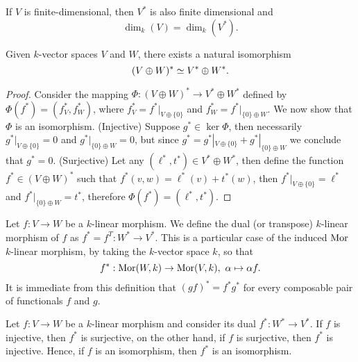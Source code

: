 \begin{proposition}
If \(V\) is finite-dimensional, then \(V^\ast\) is also finite dimensional and
\[
  \dim_k(V) = \dim_k (V^\ast).
\]
\end{proposition}

\begin{proposition}
Given \(k\)-vector spaces \(V\) and \(W\), there exists a natural isomorphism
\[
  (V \oplus W)^\ast \simeq V^\ast \oplus W^\ast.
\]
\end{proposition}

\begin{proof}
Consider the mapping \(\Phi: (V \oplus W)^\ast \to V^\ast \oplus W^\ast\)
defined by \(\Phi(f^\ast) = (f^\ast_V, f^\ast_W)\), where \(f^\ast_V =
f^\ast|_{V \oplus \{0\}} \) and \(f^\ast_W = f^\ast|_{\{0\} \oplus W}\). We
now show that \(\Phi\) is an isomorphism. (Injective) Suppose \(g^\ast \in
\ker \Phi\), then necessarily \(g^\ast|_{V\oplus \{0\}} = 0\) and
\(g^\ast|_{\{0\} \oplus W} = 0\), but since \(g^\ast = g^\ast|_{V\oplus
\{0\}} + g^\ast|_{\{0\} \oplus W}\) we conclude that \(g^\ast = 0\).
(Surjective) Let any \((\ell^\ast, t^\ast) \in V^\ast \oplus W^\ast\), then
define the function \(f^\ast \in (V \oplus W)^\ast\) such that \(f^\ast(v, w)
= \ell^\ast(v) + t^\ast(w)\), then \(f^\ast|_{V \oplus \{0\}} = \ell^\ast\)
and \(f^\ast|_{\{0\} \oplus W} = t^\ast\), therefore \(\Phi(f^\ast) =
(\ell^\ast, t^\ast)\).
\end{proof}

\begin{definition}\label{def:dual-morphism}
Let \(f : V \to W\) be a \(k\)-linear morphism. We define the dual (or
transpose) \(k\)-linear morphism of \(f\) as \(f^\ast = f^T : W^\ast \to
V^\ast\). This is a particular case of the induced \(\operatorname{Mor}\) \(k\)-linear
morphism, by taking the \(k\)-vector space \(k\), so that
\[
  f^\ast : \operatorname{Mor}(W, k) \to \operatorname{Mor}(V, k),\ \alpha \mapsto \alpha  f.
\]
It is immediate from this definition that \((g f)^{*} = f^{*} g^{*}\) for
every composable pair of functionals \(f\) and \(g\).
\end{definition}

\begin{proposition}
Let \(f : V \to W\) be a \(k\)-linear morphism and consider its dual \(f^\ast
: W^\ast \to V^\ast\). If \(f\) is injective, then \(f^\ast\) is surjective,
on the other hand, if \(f\) is surjective, then \(f^\ast\) is injective.
Hence, if \(f\) is an isomorphism, then \(f^*\) is an isomorphism.
\end{proposition}

